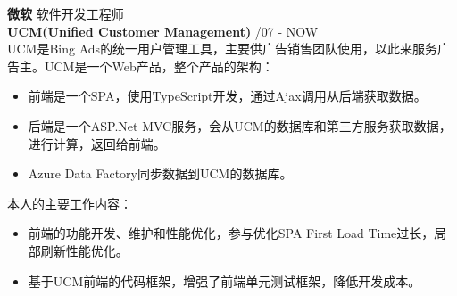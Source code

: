 \documentclass[a4paper]{article}
\newenvironment{changemargin}[2]{%
  \begin{list}{}{%
    \setlength{\topsep}{0pt}%
    \setlength{\leftmargin}{#1}%
    \setlength{\rightmargin}{#2}%
    \setlength{\listparindent}{\parindent}%
    \setlength{\itemindent}{\parindent}%
    \setlength{\parsep}{\parskip}%
  }%
  \item[]}{\end{list}
}
\newenvironment{body} {
	\vspace*{-16pt}
	\begin{changemargin}{-0.5in}{-0.5in}
  }	
	{\end{changemargin}
}
\begin{document}
\begin{body}
	\vspace{16pt}
	\textbf{微软} \hfill 软件开发工程师\\ 
	\textbf{\fontarial UCM(Unified Customer Management)} \hfill {/07 - NOW}\\ 
	{\fontarial UCM}是{\fontarial Bing Ads}的统一用户管理工具，主要供广告销售团队使用，以此来服务广告主。{\fontarial UCM}是一个{\fontarial Web}产品，整个产品的架构：\\
	\vspace*{-6pt}
	\begin{itemize} \itemsep -0pt  %
		\item 前端是一个{\fontarial SPA}，使用{\fontarial TypeScript}开发，通过{\fontarial Ajax}调用从后端获取数据。\\
	\end{itemize}
	\vspace*{-12pt}
	\begin{itemize} \itemsep -0pt  %
		\item 后端是一个{\fontarial ASP.Net MVC}服务，会从{\fontarial UCM}的数据库和第三方服务获取数据，进行计算，返回给前端。\\
	\end{itemize}
	\vspace*{-12pt}
	\begin{itemize} \itemsep -0pt  %
		\item {\fontarial Azure Data Factory}同步数据到{\fontarial UCM}的数据库。\\
	\end{itemize}
	\vspace*{-6pt}
	本人的主要工作内容：\\ 
	\vspace*{-6pt}
	\begin{itemize} \itemsep -0pt  %
		\item 前端的功能开发、维护和性能优化，参与优化{\fontarial SPA First Load Time}过长，局部刷新性能优化。\\
	\end{itemize}
	\vspace*{-12pt}
	\begin{itemize} \itemsep -0pt  %
		\item 基于{\fontarial UCM}前端的代码框架，增强了前端单元测试框架，降低开发成本。\\

\end{itemize}
\end{body}
\end{document}
